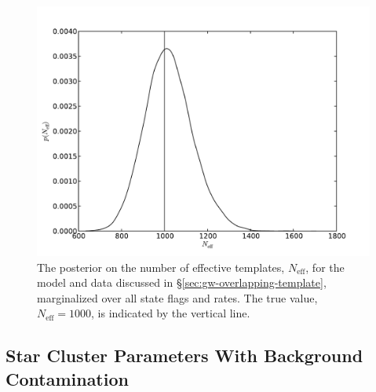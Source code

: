 \documentclass[aps,prd]{revtex4-1}
\begin{document}
\begin{figure}
  \includegraphics[width=\columnwidth]{ntemplates}
  \caption{\label{fig:ntemplates} The posterior on the number of
    effective templates, $N_\mathrm{eff}$, for the model and data
    discussed in \S \ref{sec:gw-overlapping-template}, marginalized
    over all state flags and rates.  The true value, $N_\mathrm{eff} =
    1000$, is indicated by the vertical line.}
\end{figure}

\subsection{Star Cluster Parameters With Background Contamination}
\label{sec:star-cluster}
\end{document}
